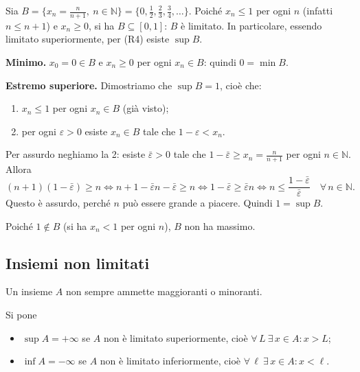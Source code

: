 \documentclass[11pt,a4paper]{article}
\begin{document}
\begin{esempio}
Sia $B = \{x_n = \frac{n}{n+1},\ n \in \mathbb{N}\} = \{0, \frac12, \frac23, \frac34, \dots\}$. Poiché $x_n \leq 1$ per ogni $n$ (infatti $n \leq n + 1$) e $x_n \geq 0$, si ha $B \subseteq [0, 1]$: $B$ è limitato. In particolare, essendo limitato superiormente, per (R4) esiste $\sup B$.

\textbf{Minimo.} $x_0 = 0 \in B$ e $x_n \geq 0$ per ogni $x_n \in B$: quindi $0 = \min B$.

\textbf{Estremo superiore.} Dimostriamo che $\sup B = 1$, cioè che:
\begin{enumerate}
    \item $x_n \leq 1$ per ogni $x_n \in B$ (già visto);
    \item per ogni $\varepsilon > 0$ esiste $x_n \in B$ tale che $1 - \varepsilon < x_n$.
\end{enumerate}
Per assurdo neghiamo la 2: esiste $\bar\varepsilon > 0$ tale che $1 - \bar\varepsilon \geq x_n = \frac{n}{n+1}$ per ogni $n \in \mathbb{N}$. Allora
\[
(n+1)(1 - \bar\varepsilon) \geq n \iff n + 1 - \bar\varepsilon n - \bar\varepsilon \geq n
\iff 1 - \bar\varepsilon \geq \bar\varepsilon n
\iff n \leq \frac{1 - \bar\varepsilon}{\bar\varepsilon} \quad \forall\, n \in \mathbb{N}.
\]
Questo è assurdo, perché $n$ può essere grande a piacere. Quindi $1 = \sup B$.

Poiché $1 \notin B$ (si ha $x_n < 1$ per ogni $n$), $B$ non ha massimo.
\end{esempio}

\subsection{Insiemi non limitati}

Un insieme $A$ non sempre ammette maggioranti o minoranti.

\begin{definizione}
Si pone
\begin{itemize}
    \item $\sup A = +\infty$ se $A$ non è limitato superiormente, cioè
          $\forall\, L \ \exists\, x \in A : x > L$;
    \item $\inf A = -\infty$ se $A$ non è limitato inferiormente, cioè
          $\forall\, \ell \ \exists\, x \in A : x < \ell$.
\end{itemize}
\end{definizione}
\end{document}

